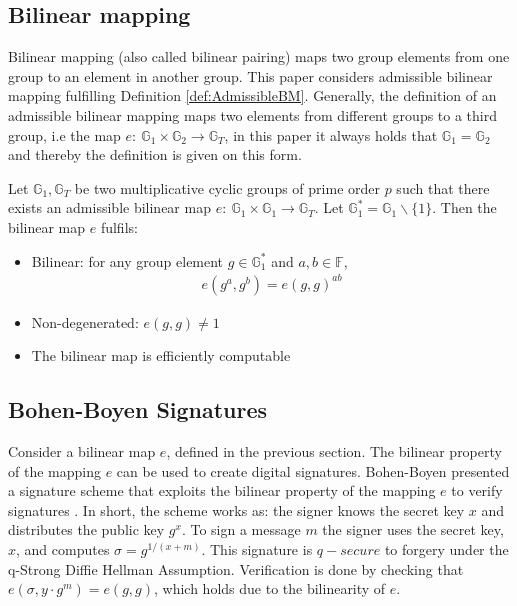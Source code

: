 \subsection*{Bilinear mapping}
\label{sec:bilinear}
Bilinear mapping (also called bilinear pairing) maps two group elements from one group to an element in another group. This paper considers admissible bilinear mapping fulfilling Definition \ref{def:AdmissibleBM}. Generally, the definition of an admissible bilinear mapping maps two elements from different groups to a third group, i.e the map $e: \: \mathds{G}_1\times \mathds{G}_2 \to \mathds{G}_T$,  in this paper it always holds that $\mathds{G}_1=\mathds{G}_2$ and thereby the definition is given on this form. 
\begin{Mydef}
	\label{def:AdmissibleBM}
	Let $\mathds{G}_1,\mathds{G}_T$ be two multiplicative cyclic groups of prime order $p$ such that there exists an admissible bilinear map $e: \: \mathds{G}_1\times \mathds{G}_1 \to \mathds{G}_T$. Let $\mathds{G}_1^*=\mathds{G}_1\backslash \{1\}$.  Then the bilinear map $e$ fulfils:
	\begin{itemize}
		\item Bilinear: for any group element  $g\in\mathds{G}_1^*$ and $a,b \in \mathds{F}$,
		\begin{align*}
			e(g^a,g^b) = e(g,g)^{ab}
		\end{align*}	
		\item Non-degenerated: $e(g,g)\neq 1$	 
		\item The bilinear map is efficiently computable
	\end{itemize}
\end{Mydef}

\subsection*{Bohen-Boyen Signatures}
Consider a bilinear map $e$, defined in the previous section. The bilinear property of the mapping $e$ can be used to create digital signatures. Bohen-Boyen presented a signature scheme that exploits the bilinear property of the mapping $e$ to verify signatures \cite{Bohen-Boyen}.  In short, the scheme works as: the signer knows the secret key $x$ and distributes the public key $g^x$. To sign a message $m$ the signer uses the secret key, $x$, and computes $\sigma = g^{1/(x+m)}$. This signature is $q-secure$ to forgery under the q-Strong Diffie Hellman Assumption. Verification is done by checking that $e(\sigma,y\cdot g^m) = e(g,g)$, which holds due to the bilinearity of $e$. 


